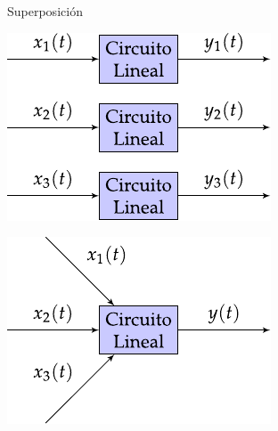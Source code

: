 \documentclass[aspectratio=169, usenames,svgnames,dvipsnames]{beamer}
\begin{document}
\begin{frame}{Superposición}
    \begin{minipage}[c]{0.45\linewidth}
        \begin{center}
            \includegraphics[width=0.88\linewidth]{../figs/superposicion2.pdf}
        \end{center}
    \end{minipage}
    \hfill%
    \begin{minipage}[c]{0.45\linewidth}
        \begin{center}
            \includegraphics[width=0.95\linewidth]{../figs/superposicion.pdf}
        \end{center}
    \end{minipage}
\end{frame}

\end{document}
